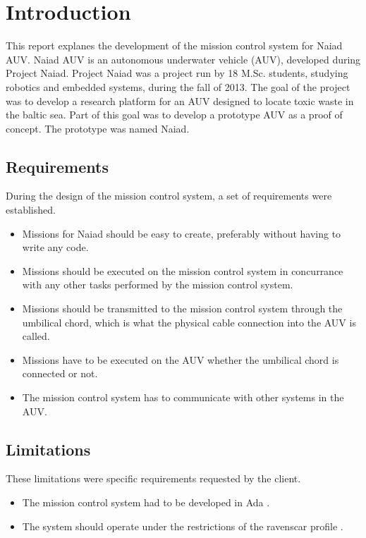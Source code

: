 \section{Introduction}\label{sec:introduction}
This report explanes the development of the mission control system for Naiad AUV. Naiad AUV is an autonomous underwater vehicle (AUV), developed during Project Naiad. Project Naiad was a project run by 18 M.Sc. students, studying robotics and embedded systems, during the fall of 2013. The goal of the project was to develop a research platform for an AUV designed to locate toxic waste in the baltic sea. Part of this goal was to develop a prototype AUV as a proof of concept. The prototype was named Naiad.

\subsection{Requirements}
During the design of the mission control system, a set of requirements were established.
\begin{itemize}
\item Missions for Naiad should be easy to create, preferably without having to write any code.
\item Missions should be executed on the mission control system in concurrance with any other tasks performed by the mission control system.
\item Missions should be transmitted to the mission control system through the umbilical chord, which is what the physical cable connection into the AUV is called.
\item Missions have to be executed on the AUV whether the umbilical chord is connected or not.
\item The mission control system has to communicate with other systems in the AUV.
\end{itemize}

\subsection{Limitations}
These limitations were specific requirements requested by the client.
\begin{itemize}
\item The mission control system had to be developed in Ada \cite{web:mcsada}.
\item The system should operate under the restrictions of the ravenscar profile \cite{article:mcsraven}. 
\end{itemize}
